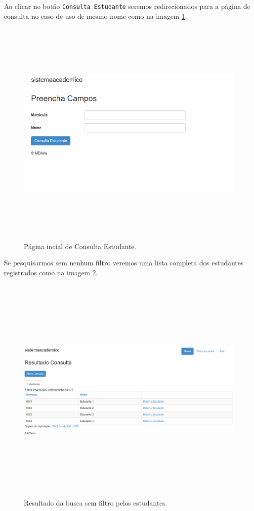 Ao clicar no botão \texttt{Consulta Estudante} seremos redirecionados para a
página de consulta no caso de uso de mesmo nome como na imagem
\ref{pagina_consulta_estudante}.
\begin{figure}[H]
	\centering
	\includegraphics[width=400pt,height=320pt]{imgs/tutorial-mdarte-0018.png}
	\caption{Página incial de Consulta Estudante.}
	\label{pagina_consulta_estudante}
\end{figure}

Se pesquisarmos sem nenhum filtro veremos uma lista completa dos estudantes
registrados como na imagem \ref{resultado_busca_sem_filtro}.
\begin{figure}[H]
	\centering
	\includegraphics[width=500pt,height=320pt]{imgs/tutorial-mdarte-0020.png}
	\caption{Resultado da busca sem filtro pelos estudantes.}
	\label{resultado_busca_sem_filtro}
\end{figure}











